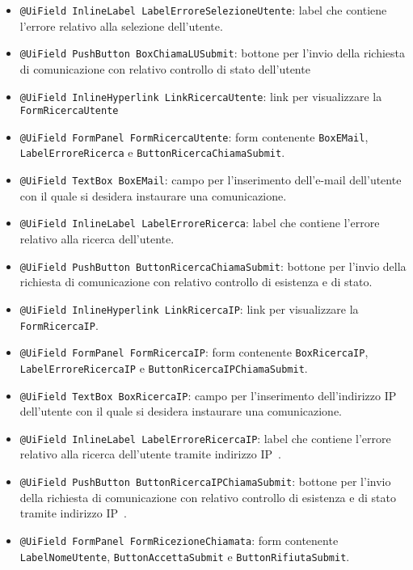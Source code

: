 {\begin{sloppypar}
{\begin{itemize}
\begin{itemize}
\begin{itemize}
						utenti registrati.
					\item[] \texttt{@UiField InlineLabel LabelErroreSelezioneUtente}: label che contiene l’errore 
						relativo alla selezione dell’utente.
					\item[] \texttt{@UiField PushButton BoxChiamaLUSubmit}: bottone per l’invio della richiesta di 
						comunicazione con relativo controllo di stato dell’utente
					\item[] \texttt{@UiField InlineHyperlink LinkRicercaUtente}: link per visualizzare la 
						\texttt{FormRicercaUtente}
					\item[] \texttt{@UiField FormPanel FormRicercaUtente}: form contenente \texttt{BoxEMail}, 
						\texttt{LabelErroreRicerca} e \texttt{ButtonRicercaChiamaSubmit}.
					\item[] \texttt{@UiField TextBox BoxEMail}: campo per l’inserimento dell’e-mail dell’utente 
						con il quale si desidera instaurare una comunicazione.
					\item[] \texttt{@UiField InlineLabel LabelErroreRicerca}: label che contiene l’errore relativo 
						alla ricerca dell’utente.
					\item[] \texttt{@UiField PushButton ButtonRicercaChiamaSubmit}: bottone per l’invio della 
						richiesta di comunicazione con relativo controllo di esistenza e di stato.
					\item[] \texttt{@UiField InlineHyperlink LinkRicercaIP}:  link per visualizzare la 
						\texttt{FormRicercaIP}.
					\item[] \texttt{@UiField FormPanel FormRicercaIP}: form contenente \texttt{BoxRicercaIP}, 
						\texttt{LabelErroreRicercaIP} e \texttt{ButtonRicercaIPChiamaSubmit}.
					\item[] \texttt{@UiField TextBox BoxRicercaIP}: campo per l’inserimento dell’indirizzo IP\g~ 
						dell’utente con il quale si desidera instaurare una comunicazione.
					\item[] \texttt{@UiField InlineLabel LabelErroreRicercaIP}: label che contiene l’errore 
						relativo alla ricerca dell’utente tramite indirizzo IP\g~.
					\item[] \texttt{@UiField PushButton ButtonRicercaIPChiamaSubmit}: bottone per l’invio della 
						richiesta di comunicazione con relativo controllo di esistenza e di stato tramite indirizzo IP\g~.
					\item[] \texttt{@UiField FormPanel FormRicezioneChiamata}: form contenente 
						\texttt{LabelNomeUtente}, \texttt{ButtonAccettaSubmit} e \texttt{ButtonRifiutaSubmit}.

\end{itemize}
\end{itemize}
\end{itemize}}
\end{sloppypar}}
